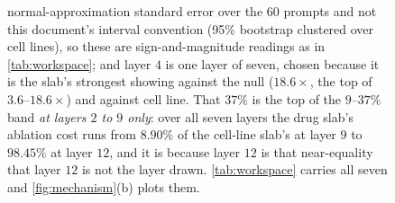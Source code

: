 \begin{figure}[htbp]
\begin{fullwidth}
{normal-approximation standard error over the $60$ prompts and not this
document's interval convention (95\% bootstrap clustered over cell lines), so
these are sign-and-magnitude readings as in \cref{tab:workspace}; and layer $4$
is one layer of seven, chosen because it is the slab's strongest showing
against the null ($18.6\times$, the top of $3.6$--$18.6\times$) and against
cell line. That $37\%$ is the top of the $9$--$37\%$ band \emph{at layers $2$
to $9$ only}: over all seven layers the drug slab's ablation cost runs from
$8.90\%$ of the cell-line slab's at layer $9$ to $98.45\%$ at layer $12$, and
it is because layer $12$ is that near-equality that layer $12$ is not the layer
drawn. \cref{tab:workspace} carries all seven and \cref{fig:mechanism}(b) plots
them.}
\label{fig:hook}
\end{fullwidth}
\end{figure}

